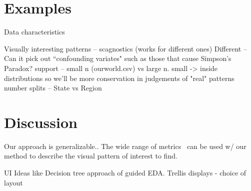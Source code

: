 \section{Examples}
Data characteristics

Visually interesting patterns -- scagnostics (works for different ones)
Different -- Can it pick out ``confounding variates" such as those that cause Simpson's Paradox?
support -- small n (ourworld.csv) vs large n. small -> inside distributions so we'll be more conservation in judgements of "real" patterns
number splits -- State vs Region

\section{Discussion}
Our approach is generalizable..
The wide range of metrics~\cite{Bertini2011} can be used w/ our method to describe the visual pattern of interest to find.

UI Ideas like 
Decision tree approach of guided EDA.
Trellis displays - choice of layout


